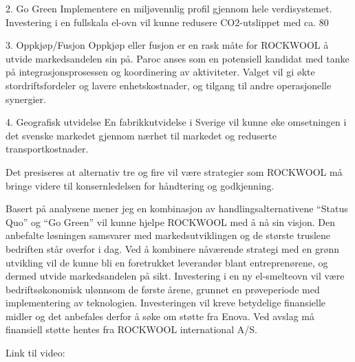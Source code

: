 2. Go Green
Implementere en miljøvennlig profil gjennom hele verdisystemet. Investering i en fullskala el-ovn vil kunne redusere CO2-utslippet med ca. 80%

3. Oppkjøp/Fusjon
Oppkjøp eller fusjon er en rask måte for ROCKWOOL å utvide markedsandelen sin på. Paroc anses som en potensiell kandidat med tanke på integrasjonsprosessen og koordinering av aktiviteter. Valget vil gi økte stordriftsfordeler og lavere enhetskostnader, og tilgang til andre operasjonelle synergier.

4. Geografisk utvidelse
En fabrikkutvidelse i Sverige vil kunne øke omsetningen i det svenske markedet gjennom nærhet til markedet og reduserte transportkostnader.

Det presiseres at alternativ tre og fire vil være strategier som ROCKWOOL må bringe videre til konsernledelsen for håndtering og godkjenning.

\indent \newline
Basert på analysene mener jeg en kombinasjon av handlingsalternativene “Status Quo” og “Go Green” vil kunne hjelpe ROCKWOOL med å nå sin visjon. Den anbefalte løsningen samsvarer med markedsutviklingen og de største truslene bedriften står overfor i dag. Ved å kombinere nåværende strategi med en grønn utvikling vil de kunne bli en foretrukket leverandør blant entreprenørene, og dermed utvide markedsandelen på sikt. Investering i en ny el-smelteovn vil være bedriftsøkonomisk ulønnsom de første årene, grunnet en prøveperiode med implementering av teknologien. Investeringen vil kreve betydelige finansielle midler og det anbefales derfor å søke om støtte fra Enova. Ved avslag må finansiell støtte hentes fra ROCKWOOL international A/S. 

\indent \newline
Link til video: 
